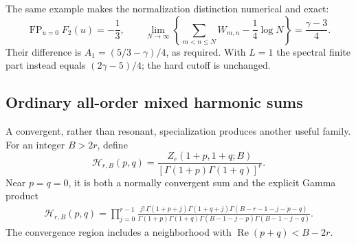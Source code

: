 \documentclass[11pt,letterpaper]{article}
\numberwithin{equation}{section}
\theoremstyle{definition}\newtheorem{definition}[theorem]{Definition}
\theoremstyle{remark}\newtheorem{remark}[theorem]{Remark}
\DeclareMathOperator{\FP}{FP}
\DeclareMathOperator{\Rea}{Re}
\begin{document}
The same example makes the normalization distinction numerical and exact:
\begin{equation}\label{dhr:eq:normalization-example}
 \FP_{u=0}F_2(u)=-\frac13,\qquad
 \lim_{N\to\infty}\left\{\sum_{m<n\leq N}W_{m,n}
                              -\frac14\log N\right\}
 =\frac{\gamma-3}{4}.
\end{equation}
Their difference is $A_1=(5/3-\gamma)/4$, as required. With $L=1$
the spectral finite part instead equals $(2\gamma-5)/4$; the hard
cutoff is unchanged.

\subsection{Ordinary all-order mixed harmonic sums}
A convergent, rather than resonant, specialization produces another
useful family. For an integer $B>2r$, define
\begin{equation}\label{dhr:eq:mixed-generator}
 \mathcal H_{r,B}(p,q)=
 \frac{Z_r(1+p,1+q;B)}{[\Gamma(1+p)\Gamma(1+q)]^r}.
\end{equation}
Near $p=q=0$, it is both a normally convergent sum and the explicit
Gamma product
\begin{align}
 \mathcal H_{r,B}(p,q)
 =\prod_{j=0}^{r-1}
 \frac{j!\,\Gamma(1+p+j)\Gamma(1+q+j)
              \Gamma(B-r-1-j-p-q)}
 {\Gamma(1+p)\Gamma(1+q)
              \Gamma(B-1-j-p)\Gamma(B-1-j-q)}.
 \label{dhr:eq:mixed-product}
\end{align}
The convergence region includes a neighborhood with
$\Rea(p+q)<B-2r$.
\end{document}
